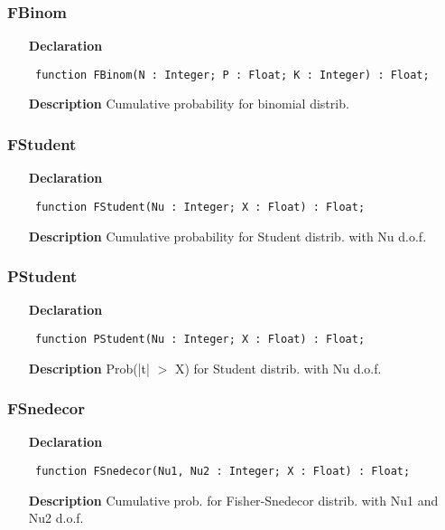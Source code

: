 \documentclass[12pt,a4paper,oneside]{report}
\newcommand{\declarationitem}[1]{\textbf{#1}}
\newcommand{\descriptiontitle}[1]{\textbf{#1}}
\newcommand{\code}[1]{\texttt{#1}}
\begin{document}
\subsubsection{FBinom}
\label{uibtdist-FBinom}
\begin{itemize}\item[\declarationitem{Declaration}\hfill]
	\begin{flushleft}
		\code{
			function FBinom(N : Integer; P : Float; K : Integer) : Float;}
	\end{flushleft}
	\item[\descriptiontitle{Description}]
	Cumulative probability for binomial distrib.
\end{itemize}
\subsubsection{FStudent}
\label{uibtdist-FStudent}
\begin{itemize}\item[\declarationitem{Declaration}\hfill]
	\begin{flushleft}
		\code{
			function FStudent(Nu : Integer; X : Float) : Float;}
	\end{flushleft}
	\item[\descriptiontitle{Description}]
	Cumulative probability for Student distrib. with Nu d.o.f.
\end{itemize}
\subsubsection{PStudent}
\label{uibtdist-PStudent}
\begin{itemize}\item[\declarationitem{Declaration}\hfill]
	\begin{flushleft}
		\code{
			function PStudent(Nu : Integer; X : Float) : Float;}
	\end{flushleft}
	\item[\descriptiontitle{Description}]
	Prob(|t| {$>$} X) for Student distrib. with Nu d.o.f.
\end{itemize}
\subsubsection{FSnedecor}
\label{uibtdist-FSnedecor}
\begin{itemize}\item[\declarationitem{Declaration}\hfill]
	\begin{flushleft}
		\code{
			function FSnedecor(Nu1, Nu2 : Integer; X : Float) : Float;}
	\end{flushleft}
	\item[\descriptiontitle{Description}]
	Cumulative prob. for Fisher{-}Snedecor distrib. with Nu1 and Nu2 d.o.f.
\end{itemize}
\end{document}
